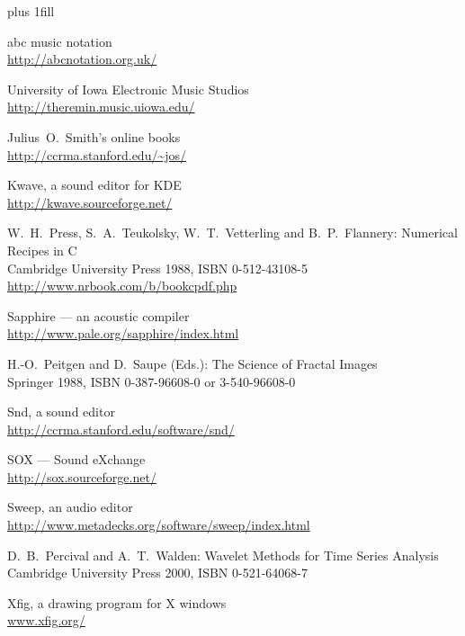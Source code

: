\documentclass{article}
\begin{document}
\begin{thebibliography}{abcd}


\rightskip=0pt plus 1fill

abc music notation \\
\url{http://abcnotation.org.uk/}

University of Iowa Electronic Music Studios \\
\url{http://theremin.music.uiowa.edu/}

Julius~O.~Smith's online books \\
\url{http://ccrma.stanford.edu/\~jos/}

Kwave, a sound editor for KDE \\
\url{http://kwave.sourceforge.net/}

W.~H.~Press, S.~A.~Teukolsky, W.~T.~Vetterling and B.~P.~Flannery: 
Numerical Recipes in C \\
Cambridge University Press 1988, ISBN 0-512-43108-5 \\
\url{http://www.nrbook.com/b/bookcpdf.php}

Sapphire --- an acoustic compiler \\
\url{http://www.pale.org/sapphire/index.html}

H.-O.\ Peitgen and D.\ Saupe (Eds.): The Science of Fractal Images \\
Springer 1988, ISBN 0-387-96608-0 or 3-540-96608-0

Snd, a sound editor \\
\url{http://ccrma.stanford.edu/software/snd/}

SOX --- Sound eXchange \\
\url{http://sox.sourceforge.net/}

Sweep, an audio editor \\
\url{http://www.metadecks.org/software/sweep/index.html}

D.\ B.\ Percival and A.\ T.\ Walden: Wavelet Methods for Time Series Analysis \\
Cambridge University Press 2000, ISBN 0-521-64068-7

Xfig, a drawing program for X windows \\
\url{www.xfig.org/}


\end{thebibliography}
\end{document}
